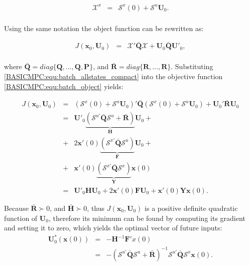    \begin{equation}
        \begin{array}{rcl}
        \mathcal{X}^x&=&\mathcal{S}^x(0)+\mathcal{S}^u\textbf{U}_0.\\
		\end{array}
        \label{BASICMPC:equ:batch_allstates_compact}
    \end{equation}

    Using the same notation the object function can be rewritten as:

    \begin{equation}
        \begin{array}{rcl}
        J(\textbf{x}_0,\textbf{U}_0)&=&\mathcal{X}'\bar{\textbf{Q}}\mathcal{X}+\textbf{U}_0\bar{\textbf{Q}}\textbf{U}'_0,\\
		\end{array}
        \label{BASICMPC:equ:batch_object}
    \end{equation}

    where $\bar{\textbf{Q}}=diag\{\textbf{Q},\dots,\textbf{Q},\textbf{P}\}$, and $\bar{\textbf{R}}=diag\{\textbf{R},\dots,\textbf{R}\}$. Substituting \ref{BASICMPC:equ:batch_allstates_compact} into the objective function \ref{BASICMPC:equ:batch_object} yields:

    \begin{equation}
        \begin{array}{rcl}
        J(\textbf{x}_0,\textbf{U}_0)&=&(\mathcal{S}^x(0)+\mathcal{S}^u\textbf{U}_0)'\bar{\textbf{Q}}(\mathcal{S}^x(0)+\mathcal{S}^u\textbf{U}_0)+\textbf{U}_0'\bar{\textbf{R}}\textbf{U}_0\\
        &=&\textbf{U}'_0\underbrace{(\mathcal{S}^{u'}\bar{\textbf{Q}}\mathcal{S}^u+\bar{\textbf{R}})}_{\textbf{H}}\textbf{U}_0+ \\
        &+&2\textbf{x}'(0)\underbrace{(\mathcal{S}^{x'}\bar{\textbf{Q}}\mathcal{S}^u)}_{\textbf{F}}\textbf{U}_0+\\
        &+&\textbf{x}'(0)\underbrace{(\mathcal{S}^{x'}\bar{\textbf{Q}}\mathcal{S}^x)}_{\textbf{Y}}\textbf{x}(0)\\
        &=&\textbf{U}'_0\textbf{H}\textbf{U}_0+2\textbf{x}'(0)\textbf{F}\textbf{U}_0+\textbf{x}'(0)\textbf{Y}\textbf{x}(0).
		\end{array}
        \label{BASICMPC:equ:batch_simplfy}
    \end{equation}

    Because $\bar{\textbf{R}}\succ 0$, and $\bar{\textbf{H}}\succ 0$, thus $J(\textbf{x}_0,\textbf{U}_0)$ is a positive definite quadratic function of $\textbf{U}_0$, therefore its minimum can be found by computing its gradient and setting it to zero, which yields the optimal vector of future inputs:
%
    \begin{equation}
        \begin{array}{rcl}
        \textbf{U}^*_0(\textbf{x}(0))&=&-\textbf{H}^{-1}\textbf{F}'x(0)\\
        &=&-(\mathcal{S}^{u'}\bar{\textbf{Q}}\mathcal{S}^{u}+\bar{\textbf{R}})^{-1}\mathcal{S}^{u'}\bar{\textbf{Q}}\mathcal{S}^{x}\textbf{x}(0).
		\end{array}
        \label{BASICMPC:equ:batch_optimal_solution}
    \end{equation}


